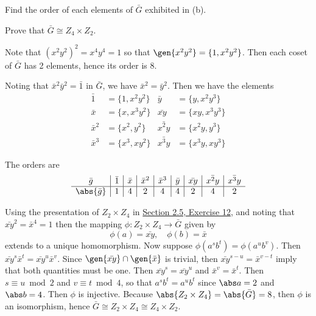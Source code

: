 \begin{problems}
\begin{problems}
        \item Find the order of each elements of $\bar G$ exhibited in (b).
        \item Prove that $\bar G \cong Z_4 \times Z_2$.
    \end{problems}
    \begin{solalph}
        \item Note that $(x^2y^2)^2 = x^4y^4 = 1$ so that $\gen{x^2y^2} = \{1, x^2y^2\}$. Then each coset of $\bar G$ has 2 elements, hence its order is 8.
        \item Noting that $\bar x^2 \bar y^2 = \bar 1$ in $\bar G$, we have $\bar x^2 = \bar y^2$. Then we have the elements
        \begin{align*}
            \bar 1 & = \{1, x^2y^2\} & \bar y & = \{y, x^2y^3\} \\
            \bar x & = \{x, x^3y^2\} & \bar{xy} & = \{xy, x^3y^3\} \\
            \bar x^2 & = \{x^2, y^2\} & \bar{x^2y} & = \{x^2y, y^3\} \\
            \bar x^3 & = \{x^3, xy^2\} & \bar{x^3y} & = \{x^3y, xy^3\}
        \end{align*}
        \item The orders are
        \[
        \begin{array}{c|c|c|c|c|c|c|c|c}
            \bar g & \bar 1 & \bar x & \bar x^2 & \bar x^3 & \bar y & \bar{xy} & \bar{x^2y} & \bar{x^3y} \\
            \hline
            \abs{\bar g} & 1 & 4 & 2 & 4 & 4 & 2 & 4 & 2
        \end{array}
        \]
        \item Using the presentation of $Z_2 \times Z_4$ in \hyperref[ex2.5.12]{Section 2.5, Exercise 12}, and noting that $\bar{xy}^2 = \bar x^4 = 1$ then the mapping $\phi : Z_2 \times Z_4 \to \bar G$ given by
        \[\phi(a) = \bar{xy}, \quad \phi(b) = \bar x\]
        extends to a unique homomorphism. Now suppose $\phi(a^sb^t) = \phi(a^ub^v)$. Then $\bar{xy}^s\bar x^t = \bar{xy}^u\bar x^v$. Since $\gen{\bar{xy}} \cap \gen{\bar x}$ is trivial, then $\bar{xy}^{s - u} = \bar x^{v - t}$ imply that both quantities must be one. Then $\bar{xy}^s = \bar{xy}^u$ and $\bar x^v = \bar x^t$. Then $s \equiv u \bmod 2$ and $v \equiv t \bmod 4$, so that $a^sb^t = a^ub^t$ since $\abs a = 2$ and $\abs b = 4$. Then $\phi$ is injective. Because $\abs{Z_2 \times Z_4} = \abs{\bar G} = 8$, then $\phi$ is an isomorphism, hence $\bar G \cong Z_2 \times Z_4 \cong Z_4 \times Z_2$.
    \end{solalph}

\end{problems}
